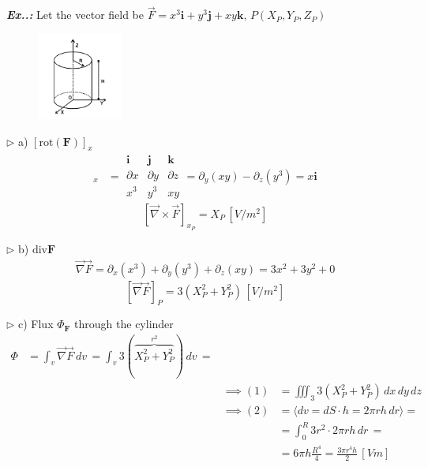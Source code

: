 \documentclass[a4paper]{article}
\begin{document}
\vspace{2ex}\textbf{\textit{Ex.\thesection.\theex: }}Let the vector field be $\vec{F}=x^{3}\mathbf{i}+y^{3}\mathbf{j}+xy\mathbf{k},\,P(X_{P},Y_{P},Z_{P})$ 

\begin{figure}[H]
    \centering
    \includegraphics[width=0.25\textwidth]{IMG/c1_rec_2020.png}
    \caption{}
    \label{fig:c1_rec_2020}
\end{figure}

$\triangleright$ a) $[\text{rot}(\mathbf{F})]_{x}$ 
\begin{align}
[\vec{\nabla}\times \vec{F}]_{x}&=\begin{array}{|ccc|}
\mathbf{i} & \mathbf{j} & \mathbf{k} \\
\partial x & \partial y & \partial z \\
x^{3} & y^{3} & xy
\end{array}=\partial_{y}(xy)-\partial_{z}(y^{3})=x\mathbf{i}
\end{align}
$$
\boxed{[\vec{\nabla}\times \vec{F}]_{x_{P}}=X_{P}\,[V / m^{2}]}
$$

$\triangleright$ b) $\text{div}\mathbf{F}$
\begin{align}
\vec{\nabla}\vec{F}=\partial_{x}(x^{3})+\partial_{y}(y^{3})+\partial_{z}(xy)=3x^{2}+3y^{2}+0
\end{align}
$$
\boxed{[\vec{\nabla}\vec{F}]_{P}=3(X_{P}^{2}+Y_{P}^{2})\,[V / m^{2}]}
$$

$\triangleright$ c) Flux $\Phi_{\mathbf{F}}$ through the cylinder
\begin{align}
\Phi&=\int _{v}\vec{\nabla}\vec{F} \, dv\, =\int _{v}3(\overbrace{X_{P}^{2}+Y_{P}^{2}}^{r^{2}}) \, dv\,= \\
&& \implies(1)&=\iiint_{3}3(X_{P}^{2}+Y_{P}^{2})\,dx\,dy\,dz \\
&&\implies(2)&=\langle dv=dS\cdot h=2\pi rh\,dr\rangle = \\
&&&=\int_{0}^{R} 3r^{2}\cdot 2\pi rh \, dr\, = \\
&&&=6\pi h \frac{R^{4}}{4}=\boxed{\frac{3\pi r^{4}h}{2}\,[Vm]}
\end{align}
\end{document}
